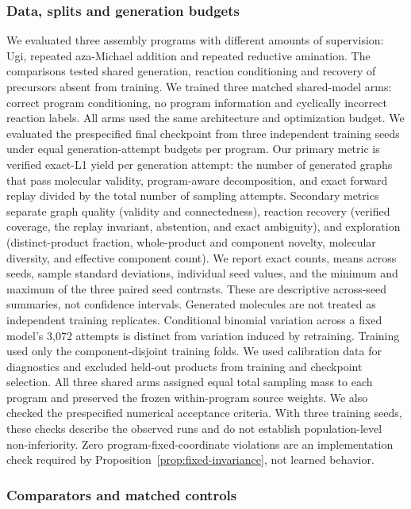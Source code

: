 \documentclass{article}
\theoremstyle{definition}
\newcommand{\ForgeProseAttemptsPerProgram}{3{,}072}
\begin{document}
\subsubsection{Data, splits and generation budgets}

We evaluated three assembly programs with different amounts of supervision: Ugi, repeated
aza-Michael addition and repeated reductive amination. The comparisons tested shared generation,
reaction conditioning and recovery of precursors absent from training. We trained three matched shared-model arms: correct program conditioning, no program
information and cyclically incorrect reaction labels. All arms used the same architecture and
optimization budget. We evaluated the prespecified final checkpoint from three independent training
seeds under equal generation-attempt budgets per program.
Our primary metric is verified exact-L1 yield per generation attempt: the number of generated graphs that
pass molecular validity, program-aware decomposition, and exact forward replay divided by the total
number of sampling attempts.
Secondary metrics separate graph quality (validity and connectedness), reaction recovery (verified
coverage, the replay invariant, abstention, and exact ambiguity), and exploration (distinct-product fraction, whole-product and
component novelty, molecular diversity, and effective component count).
We report exact counts, means across seeds, sample standard deviations, individual seed values, and
the minimum and maximum of the three paired seed contrasts. These are descriptive across-seed
summaries, not confidence intervals. Generated molecules are not treated as independent training
replicates. Conditional binomial variation across a fixed model's
\ForgeProseAttemptsPerProgram{} attempts is distinct from
variation induced by retraining.
Training used only the component-disjoint training folds. We used calibration data for diagnostics
and excluded held-out products from training and checkpoint selection. All three shared arms
assigned equal total sampling mass to each program and preserved the frozen within-program source
weights.
We also checked the prespecified numerical acceptance criteria. With three training seeds, these
checks describe the observed runs and do not establish population-level non-inferiority. Zero program-fixed-coordinate violations are an implementation check required by
Proposition~\ref{prop:fixed-invariance}, not learned behavior.

\subsubsection{Comparators and matched controls}
\end{document}
